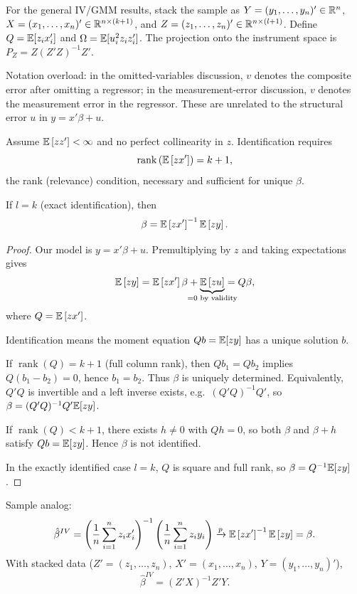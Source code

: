 \begin{remark}
	For the general IV/GMM results, stack the sample as $Y=(y_1,\ldots,y_n)'\in\mathbb{R}^{n}$, $X=(x_1,\ldots,x_n)'\in\mathbb{R}^{n\times(k+1)}$, and $Z=(z_1,\ldots,z_n)'\in\mathbb{R}^{n\times(l+1)}$. Define $Q=\mathbb{E}[z_i x_i']$ and $\Omega=\mathbb{E}[u_i^2 z_i z_i']$. The projection onto the instrument space is $P_Z = Z(Z'Z)^{-1}Z'$.

	Notation overload: in the omitted-variables discussion, $v$ denotes the composite error after omitting a regressor; in the measurement-error discussion, $v$ denotes the measurement error in the regressor. These are unrelated to the structural error $u$ in $y=x'\beta+u$.
\end{remark}

\begin{proposition}
	Assume $\mathbb{E}\left[zz'\right]<\infty$ and no perfect collinearity in $z$. Identification requires \[
		\operatorname{rank}\left(\mathbb{E}\left[zx'\right]\right)=k+1
	,\]
	the rank (relevance) condition, necessary and sufficient for unique $\beta$.

	If $l=k$ (exact identification), then \[
		\beta = \mathbb{E}\left[zx'\right]^{-1}\mathbb{E}\left[zy\right]
	.\]
\end{proposition}
\begin{proof}
	Our model is $y = x'\beta + u$. Premultiplying by $z$ and taking expectations gives
	\[
		\E\left[zy\right] = \E\left[zx'\right]\beta + \underbrace{\E\left[zu\right]}_{\mathclap{=0\text{ by validity}}}
		= Q\beta
	,\]
	where $Q=\mathbb{E}\left[zx'\right]$.

	Identification means the moment equation $Qb=\mathbb{E}[zy]$ has a unique solution $b$.

	If $\operatorname{rank}(Q)=k+1$ (full column rank), then $Qb_1=Qb_2$ implies $Q(b_1-b_2)=0$, hence $b_1=b_2$. Thus $\beta$ is uniquely determined. Equivalently, $Q'Q$ is invertible and a left inverse exists, e.g.\ $(Q'Q)^{-1}Q'$, so $\beta=(Q'Q)^{-1}Q'\mathbb{E}[zy]$.

	If $\operatorname{rank}(Q)<k+1$, there exists $h\ne 0$ with $Qh=0$, so both $\beta$ and $\beta+h$ satisfy $Qb=\mathbb{E}[zy]$. Hence $\beta$ is not identified.

	In the exactly identified case $l=k$, $Q$ is square and full rank, so $\beta = Q^{-1}\mathbb{E}[zy]$.
\end{proof}

\begin{proposition}[IV estimator when $l=k$]
	Sample analog: \[
		\hat{\beta}^{IV} = \left(\frac{1}{n}\sum_{i=1}^{n} z_i x_i'\right)^{-1}\left(\frac{1}{n}\sum_{i=1}^{n} z_i y_i\right) \xrightarrow{p} \mathbb{E}\left[zx'\right] ^{-1} \mathbb{E}\left[zy\right] = \beta
	.\]
	With stacked data ($Z'=(z_1,\ldots,z_n)$, $X'=(x_1,\ldots,x_n)$, $Y=(y_1,\ldots,y_n)'$), \[
		\hat{\beta}^{IV} = (Z'X)^{-1}Z'Y
	.\]
\end{proposition}

